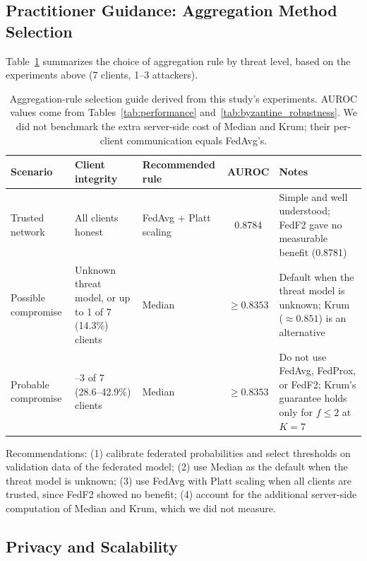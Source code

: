 \documentclass[journal]{IEEEtran}
\begin{document}
\subsection{Practitioner Guidance: Aggregation Method Selection}

Table~\ref{tab:deployment_guidance} summarizes the choice of aggregation rule by threat level, based on the experiments above (7 clients, 1--3 attackers).

\begin{table}[t]
\caption{Aggregation-rule selection guide derived from this study's experiments. AUROC values come from Tables~\ref{tab:performance} and~\ref{tab:byzantine_robustness}. We did not benchmark the extra server-side cost of Median and Krum; their per-client communication equals FedAvg's.}
\centering
\small
\setlength{\tabcolsep}{4pt}
\begin{tabularx}{\textwidth}{>{\raggedright\arraybackslash}p{2.6cm} >{\raggedright\arraybackslash}p{3.2cm} >{\raggedright\arraybackslash}p{3.4cm} c >{\raggedright\arraybackslash}X}
\toprule
\textbf{Scenario} & \textbf{Client integrity} & \textbf{Recommended rule} & \textbf{AUROC} & \textbf{Notes} \\
\midrule
Trusted network & All clients honest & FedAvg + Platt scaling & 0.8784 & Simple and well understood; FedF2 gave no measurable benefit (0.8781) \\
\midrule
Possible compromise & Unknown threat model, or up to 1 of 7 (14.3\%) clients & Median & $\geq 0.8353$ & Default when the threat model is unknown; Krum ($\approx0.851$) is an alternative \\
\midrule
Probable compromise & 2--3 of 7 (28.6--42.9\%) clients & Median & $\geq 0.8353$ & Do not use FedAvg, FedProx, or FedF2; Krum's guarantee holds only for $f\le2$ at $K=7$ \\
\bottomrule
\end{tabularx}
\label{tab:deployment_guidance}
\end{table}

Recommendations: (1) calibrate federated probabilities and select thresholds on validation data of the federated model; (2) use Median as the default when the threat model is unknown; (3) use FedAvg with Platt scaling when all clients are trusted, since FedF2 showed no benefit; (4) account for the additional server-side computation of Median and Krum, which we did not measure.

\subsection{Privacy and Scalability}
\label{sec:privacy_scalability}
\end{document}

